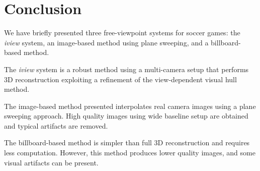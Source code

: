 \section{Conclusion}
We have briefly presented three free-viewpoint systems for soccer games: the \textit{iview} system, an image-based method using 
plane sweeping, and a billboard-based method.

The \textit{iview} system is a robust method using a multi-camera setup that performs 3D reconstruction exploiting a refinement 
of the view-dependent visual hull method.

The image-based method presented interpolates real camera images using a plane sweeping approach.
High quality images using wide baseline setup are obtained and typical artifacts are removed.

The billboard-based method is simpler than full 3D reconstruction and requires less computation.
However, this method produces lower quality images, and some visual artifacts can be present.

